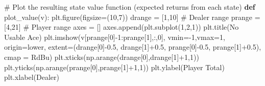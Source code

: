 \documentclass[
  letterpaper,
  DIV=11,
  numbers=noendperiod]{scrartcl}
\newenvironment{Shaded}{\begin{snugshade}}{\end{snugshade}}
\newcommand{\CommentTok}[1]{\textcolor[rgb]{0.37,0.37,0.37}{#1}}
\newcommand{\DecValTok}[1]{\textcolor[rgb]{0.68,0.00,0.00}{#1}}
\newcommand{\FloatTok}[1]{\textcolor[rgb]{0.68,0.00,0.00}{#1}}
\newcommand{\KeywordTok}[1]{\textcolor[rgb]{0.00,0.23,0.31}{\textbf{#1}}}
\newcommand{\NormalTok}[1]{\textcolor[rgb]{0.00,0.23,0.31}{#1}}
\newcommand{\OperatorTok}[1]{\textcolor[rgb]{0.37,0.37,0.37}{#1}}
\newcommand{\StringTok}[1]{\textcolor[rgb]{0.13,0.47,0.30}{#1}}
\begin{document}
\begin{Shaded}
\begin{Highlighting}[]
\CommentTok{\# Plot the resulting state value function (expected returns from each state)}
\KeywordTok{def}\NormalTok{ plot\_value(v):}
\NormalTok{    plt.figure(figsize}\OperatorTok{=}\NormalTok{(}\DecValTok{10}\NormalTok{,}\DecValTok{7}\NormalTok{))}
\NormalTok{    drange }\OperatorTok{=}\NormalTok{ [}\DecValTok{1}\NormalTok{,}\DecValTok{10}\NormalTok{] }\CommentTok{\# Dealer range}
\NormalTok{    prange }\OperatorTok{=}\NormalTok{ [}\DecValTok{4}\NormalTok{,}\DecValTok{21}\NormalTok{] }\CommentTok{\# Player range}
\NormalTok{    axes }\OperatorTok{=}\NormalTok{ []}
\NormalTok{    axes.append(plt.subplot(}\DecValTok{1}\NormalTok{,}\DecValTok{2}\NormalTok{,}\DecValTok{1}\NormalTok{))}
\NormalTok{    plt.title(}\StringTok{\textquotesingle{}No Usable Ace\textquotesingle{}}\NormalTok{)}
\NormalTok{    plt.imshow(v[prange[}\DecValTok{0}\NormalTok{]}\OperatorTok{{-}}\DecValTok{1}\NormalTok{:prange[}\DecValTok{1}\NormalTok{],:,}\DecValTok{0}\NormalTok{], }
\NormalTok{               vmin}\OperatorTok{={-}}\DecValTok{1}\NormalTok{,vmax}\OperatorTok{=}\DecValTok{1}\NormalTok{,}
\NormalTok{               origin}\OperatorTok{=}\StringTok{\textquotesingle{}lower\textquotesingle{}}\NormalTok{, }
\NormalTok{               extent}\OperatorTok{=}\NormalTok{(drange[}\DecValTok{0}\NormalTok{]}\OperatorTok{{-}}\FloatTok{0.5}\NormalTok{,}
\NormalTok{                       drange[}\DecValTok{1}\NormalTok{]}\OperatorTok{+}\FloatTok{0.5}\NormalTok{,}
\NormalTok{                       prange[}\DecValTok{0}\NormalTok{]}\OperatorTok{{-}}\FloatTok{0.5}\NormalTok{,}
\NormalTok{                       prange[}\DecValTok{1}\NormalTok{]}\OperatorTok{+}\FloatTok{0.5}\NormalTok{),}
\NormalTok{               cmap }\OperatorTok{=} \StringTok{\textquotesingle{}RdBu\textquotesingle{}}\NormalTok{)}
\NormalTok{    plt.xticks(np.arange(drange[}\DecValTok{0}\NormalTok{],drange[}\DecValTok{1}\NormalTok{]}\OperatorTok{+}\DecValTok{1}\NormalTok{,}\DecValTok{1}\NormalTok{))}
\NormalTok{    plt.yticks(np.arange(prange[}\DecValTok{0}\NormalTok{],prange[}\DecValTok{1}\NormalTok{]}\OperatorTok{+}\DecValTok{1}\NormalTok{,}\DecValTok{1}\NormalTok{))}
\NormalTok{    plt.ylabel(}\StringTok{\textquotesingle{}Player Total\textquotesingle{}}\NormalTok{)}
\NormalTok{    plt.xlabel(}\StringTok{\textquotesingle{}Dealer\textquotesingle{}}\NormalTok{)}
    

\end{Highlighting}
\end{Shaded}
\end{document}
